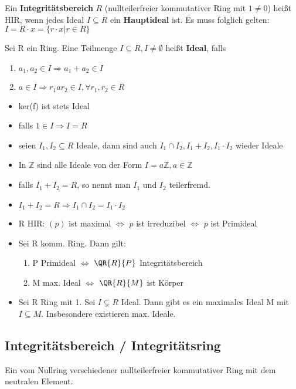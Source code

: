 Ein \textbf{Integritätsbereich} $R$ (nullteilerfreier kommutativer Ring mit $1 \neq 0$) heißt HIR, wenn jedes Ideal $I \subseteq R$ ein \textbf{Hauptideal} ist. Es muss folglich gelten:
$I = R \cdot x = \{ r \cdot x | r \in R\}$

\begin{definition}
Sei R ein Ring. Eine Teilmenge $I \subseteq R, I \neq \emptyset$ heißt \textbf{Ideal}, falls
\begin{enumerate}
	\item $a_1,a_2 \in I \Rightarrow a_1+a_2 \in I$
	\item $a \in I \Rightarrow r_1 a r_2 \in I, \forall r_1,r_2 \in R$
\end{enumerate}
\end{definition}

\begin{remark}
\leavevmode
\begin{itemize}
	\item ker(f) ist stets Ideal
	\item falls $1 \in I \Rightarrow I = R$
	\item seien $I_1,I_2 \subseteq R$ Ideale, dann sind auch $I_1 \cap I_2, I_1+I_2, I_1 \cdot I_2$ wieder Ideale
	\item In $\mathbb{Z}$ sind alle Ideale von der Form $I=a\mathbb{Z}, a \in \mathbb{Z}$
	\item falls $I_1+I_2 = R$, so nennt man $I_1$ und $I_2$ teilerfremd.
	\item $I_1+I_2 = R \Rightarrow I_1 \cap I_2 = I_1 \cdot I_2$
	\item R HIR: $(p)$ ist maximal $ \Leftrightarrow $ $p$ ist irreduzibel $\Leftrightarrow$ $p$ ist Primideal
	\item Sei R komm. Ring. Dann gilt:
	\begin{enumerate}
		\item P Primideal $\Leftrightarrow$ $\QR{R}{P}$ Integritätsbereich
		\item M max. Ideal $\Leftrightarrow$ $\QR{R}{M}$ ist Körper
	\end{enumerate}
	\item Sei R Ring mit 1. Sei $I \subsetneq R $ Ideal. Dann gibt es ein maximales Ideal M mit $ I \subseteq M$. Insbesondere existieren max. Ideale.
\end{itemize}
\end{remark}

\subsection{Integritätsbereich / Integritätsring}
Ein vom Nullring verschiedener nullteilerfreier kommutativer Ring mit dem neutralen Element.

